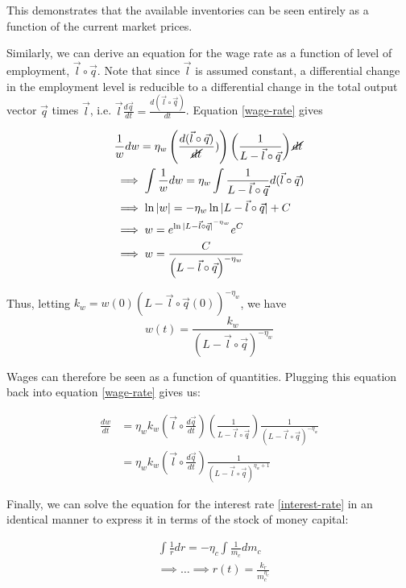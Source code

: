 \documentclass{article}
\theoremstyle{definition}
\begin{document}
This demonstrates that the available inventories can be seen entirely as a function of the current market prices. 

Similarly, we can derive an equation for the wage rate as a function of level of employment, $\vec{l} \circ \vec{q}$. Note that since $\vec{l}$ is assumed constant, a differential change in the employment level is reducible to a differential change in the total output vector $\vec{q}$ times $\vec{l}$, i.e. $\vec{l}\frac{d\vec{q}}{dt} = \frac{d(\vec{l}\circ\vec{q})}{dt}$. Equation \ref{wage-rate} gives

\begin{align}
    & \frac{1}{w}dw = \eta_w\left( \frac{d(\vec{l}\circ \vec{q})}{\cancel{dt}}) \right)\left( \frac{1}{L-\vec{l}\circ\vec{q}} \right)\cancel{dt} \\
    &\implies \int \frac{1}{w}dw = \eta_w\int \frac{1}{L-\vec{l}\circ\vec{q}}d(\vec{l}\circ\vec{q}) \\
    &\implies \ln|w| = -\eta_w \ln|L-\vec{l}\circ\vec{q}|+C \\
    &\implies w = e^{{\ln|L-\vec{l}\circ\vec{q}|}^{-\eta_w}}e^C \\
    &\implies w = \frac{C}{ \left( L-\vec{l}\circ\vec{q} \right)^{-\eta_w}}
\end{align}

Thus, letting $k_w = w(0)(L-\vec{l}\circ\vec{q}(0))^{-\eta_w}$, we have
\begin{equation}
    w(t) = \frac{k_w}{\left(L-\vec{l}\circ\vec{q}\right)^{-\eta_w}} \label{wages-over-time}
\end{equation}

Wages can therefore be seen as a function of quantities. Plugging this equation back into equation \ref{wage-rate} gives us:

\begin{align} 
    \frac{dw}{dt} &= \eta_wk_w\left( \vec{l}\circ \frac{d\vec{q}}{dt}\right)\left(\frac{1}{L-\vec{l}\circ\vec{q}}\right)\frac{1}{\left(L-\vec{l}\circ\vec{q}\right)^{-\eta_w}} \\
                  &= \eta_wk_w\left( \vec{l}\circ \frac{d\vec{q}}{dt}\right)\frac{1}{(L-\vec{l}\circ\vec{q})^{\eta_w+1}} \label{wages-in-terms-of-quantities}
\end{align}

Finally, we can solve the equation for the interest rate \ref{interest-rate} in an identical manner to express it in terms of the stock of money capital:

\begin{align}
   & \int\frac{1}{r}dr = -\eta_c \int \frac{1}{m_c}dm_c \\
   &\implies \ldots \implies r(t) = \frac{k_r}{m_c^{\eta_c}}
\end{align}
\end{document}
